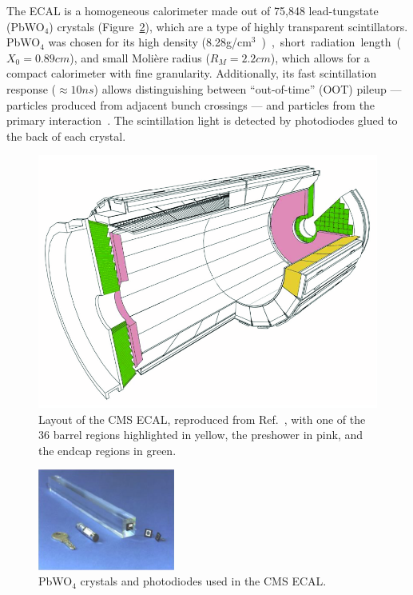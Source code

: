 The ECAL is a homogeneous calorimeter made out of 75,848 lead-tungstate (PbWO$_4$) crystals (Figure~\ref{fig:02_cms_ecal_crystals}), which are a type of highly transparent scintillators.
PbWO$_4$ was chosen for its high density (8.28\unit{g/cm$^3$}), short radiation length ($X_0 = 0.89\unit{cm}$), and small Moli\`ere radius ($R_M = 2.2\unit{cm}$), which allows for a compact calorimeter with fine granularity.
Additionally, its fast scintillation response ($\approx 10\unit{ns}$) allows distinguishing between ``out-of-time'' (OOT) pileup --- particles produced from adjacent bunch crossings --- and particles from the primary interaction~\cite{CMS:2020xlg}.
The scintillation light is detected by photodiodes glued to the back of each crystal.

\begin{figure}[ht]
    \centering
    \includegraphics[width=\textwidth]{figures/02-CMS/cms/components/ecal_layout.png}
    \caption{Layout of the CMS ECAL, reproduced from Ref.~\cite{Cooke:2022lbl}, with one of the 36 barrel regions highlighted in yellow, the preshower in pink, and the endcap regions in green.}
    \label{fig:02_cms_ecal}
\end{figure}

\begin{figure}[ht]
    \centering
    \captionsetup{justification=centering}
    \includegraphics[width=0.4\textwidth]{figures/02-CMS/cms/components/PbWO4_crystals.png}
    \caption{PbWO$_4$ crystals and photodiodes used in the CMS ECAL.}
    \label{fig:02_cms_ecal_crystals}
\end{figure}

